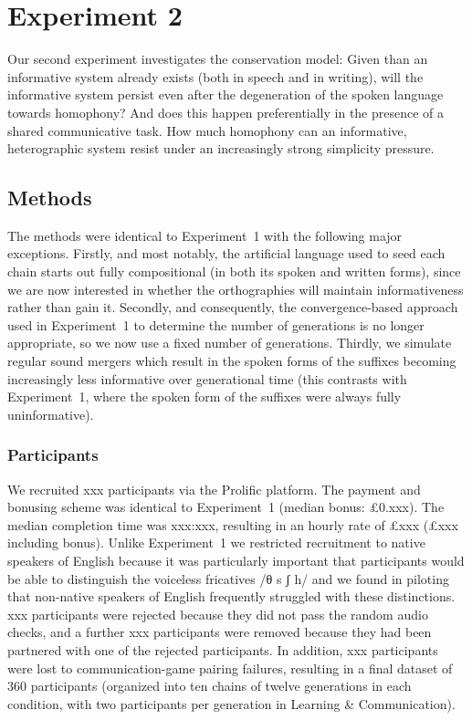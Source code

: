 \documentclass[doc,biblatex]{apa7}
\begin{document}
\section{Experiment 2}

Our second experiment investigates the conservation model: Given than an informative system already exists (both in speech and in writing), will the informative system persist even after the degeneration of the spoken language towards homophony? And does this happen preferentially in the presence of a shared communicative task. How much homophony can an informative, heterographic system resist under an increasingly strong simplicity pressure.

\subsection{Methods}

The methods were identical to Experiment~1 with the following major exceptions. Firstly, and most notably, the artificial language used to seed each chain starts out fully compositional (in both its spoken and written forms), since we are now interested in whether the orthographies will maintain informativeness rather than gain it. Secondly, and consequently, the convergence-based approach used in Experiment~1 to determine the number of generations is no longer appropriate, so we now use a fixed number of generations. Thirdly, we simulate regular sound mergers which result in the spoken forms of the suffixes becoming increasingly less informative over generational time (this contrasts with Experiment~1, where the spoken form of the suffixes were always fully uninformative).

\subsubsection{Participants}

We recruited xxx participants via the Prolific platform. The payment and bonusing scheme was identical to Experiment~1 (median bonus: £0.xxx). The median completion time was xxx:xxx, resulting in an hourly rate of £xxx (£xxx including bonus). Unlike Experiment~1 we restricted recruitment to native speakers of English because it was particularly important that participants would be able to distinguish the voiceless fricatives /θ s ʃ h/ and we found in piloting that non-native speakers of English frequently struggled with these distinctions. xxx participants were rejected because they did not pass the random audio checks, and a further xxx participants were removed because they had been partnered with one of the rejected participants. In addition, xxx participants were lost to communication-game pairing failures, resulting in a final dataset of 360 participants (organized into ten chains of twelve generations in each condition, with two participants per generation in Learning \& Communication).
\end{document}
